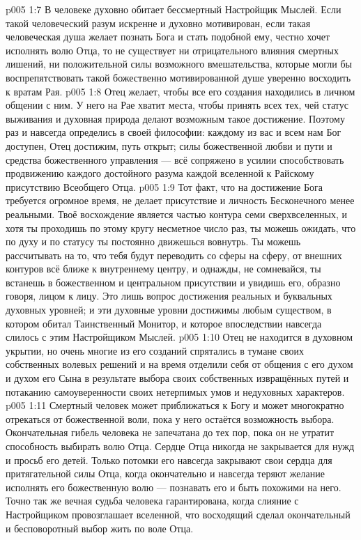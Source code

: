\vs p005 1:7 В человеке духовно обитает бессмертный Настройщик Мыслей. Если такой человеческий разум искренне и духовно мотивирован, если такая человеческая душа желает познать Бога и стать подобной ему, честно хочет исполнять волю Отца, то не существует ни отрицательного влияния смертных лишений, ни положительной силы возможного вмешательства, которые могли бы воспрепятствовать такой божественно мотивированной душе уверенно восходить к вратам Рая.
\vs p005 1:8 Отец желает, чтобы все его создания находились в личном общении с ним. У него на Рае хватит места, чтобы принять всех тех, чей статус выживания и духовная природа делают возможным такое достижение. Поэтому раз и навсегда определись в своей философии: каждому из вас и всем нам Бог доступен, Отец достижим, путь открыт; силы божественной любви и пути и средства божественного управления --- всё сопряжено в усилии способствовать продвижению каждого достойного разума каждой вселенной к Райскому присутствию Всеобщего Отца.
\vs p005 1:9 Тот факт, что на достижение Бога требуется огромное время, не делает присутствие и личность Бесконечного менее реальными. Твоё восхождение является частью контура семи сверхвселенных, и хотя ты проходишь по этому кругу несметное число раз, ты можешь ожидать, что по духу и по статусу ты постоянно движешься вовнутрь. Ты можешь рассчитывать на то, что тебя будут переводить со сферы на сферу, от внешних контуров всё ближе к внутреннему центру, и однажды, не сомневайся, ты встанешь в божественном и центральном присутствии и увидишь его, образно говоря, лицом к лицу. Это лишь вопрос достижения реальных и буквальных духовных уровней; и эти духовные уровни достижимы любым существом, в котором обитал Таинственный Монитор, и которое впоследствии навсегда слилось с этим Настройщиком Мыслей.
\vs p005 1:10 \pc Отец не находится в духовном укрытии, но очень многие из его созданий спрятались в тумане своих собственных волевых решений и на время отделили себя от общения с его духом и духом его Сына в результате выбора своих собственных извращённых путей и потаканию самоуверенности своих нетерпимых умов и недуховных характеров.
\vs p005 1:11 Смертный человек может приближаться к Богу и может многократно отрекаться от божественной воли, пока у него остаётся возможность выбора. Окончательная гибель человека не запечатана до тех пор, пока он не утратит способность выбирать волю Отца. Сердце Отца никогда не закрывается для нужд и просьб его детей. Только потомки его навсегда закрывают свои сердца для притягательной силы Отца, когда окончательно и навсегда теряют желание исполнять его божественную волю --- познавать его и быть похожими на него. Точно так же вечная судьба человека гарантирована, когда слияние с Настройщиком провозглашает вселенной, что восходящий сделал окончательный и бесповоротный выбор жить по воле Отца.

